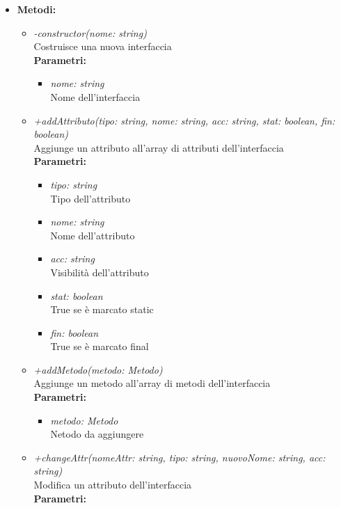 \begin{itemize}
	\item \textbf{Metodi:}
		\begin{itemize}
			\item \emph{-constructor(nome: string)}\\
    		Costruisce una nuova interfaccia\\
    		\textbf{Parametri:}
    		\begin{itemize}
    			\item \emph{nome: string}\\
    			Nome dell'interfaccia
    		\end{itemize}
    		\item \emph{+addAttributo(tipo: string, nome: string, acc: string, stat: boolean, fin: boolean)}\\
    		Aggiunge un attributo all'array di attributi dell'interfaccia\\
    		\textbf{Parametri:}
    		\begin{itemize}
    			\item \emph{tipo: string}\\
    			Tipo dell'attributo
    			\item \emph{nome: string}\\
    			Nome dell'attributo
    			\item \emph{acc: string}\\
    			Visibilità dell'attributo
    			\item \emph{stat: boolean}\\
    			True se è marcato static
    			\item \emph{fin: boolean}\\
    			True se è marcato final
    		\end{itemize}
    		\item \emph{+addMetodo(metodo: Metodo)}\\
    		Aggiunge un metodo all'array di metodi dell'interfaccia\\
    		\textbf{Parametri:}
    		\begin{itemize}
    			\item \emph{metodo: Metodo}\\
    			Netodo da aggiungere
    		\end{itemize}
    		\item \emph{+changeAttr(nomeAttr: string, tipo: string, nuovoNome: string, acc: string)}\\
    		Modifica un attributo dell'interfaccia\\
    		\textbf{Parametri:}

\end{itemize}
\end{itemize}
